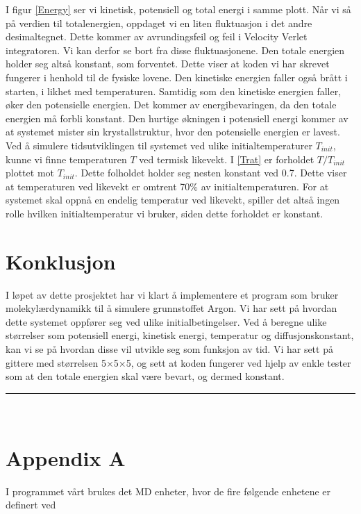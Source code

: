 \documentclass[paper=a4, fontsize=11pt]{scrartcl} %
\numberwithin{equation}{section} %
\numberwithin{figure}{section} %
\numberwithin{table}{section} %
\newcommand{\horrule}[1]{\rule{\linewidth}{#1}} %
\begin{document}
I figur \ref{Energy} ser vi kinetisk, potensiell og total energi i samme plott. Når vi så på verdien til totalenergien, oppdaget vi en liten fluktuasjon i det andre desimaltegnet. Dette kommer av avrundingsfeil og feil i Velocity Verlet integratoren. Vi kan derfor se bort fra disse fluktuasjonene. Den totale energien holder seg altså konstant, som forventet. Dette viser at koden vi har skrevet fungerer i henhold til de fysiske lovene. Den kinetiske energien faller også brått i starten, i likhet med temperaturen. Samtidig som den kinetiske energien faller, øker den potensielle energien. Det kommer av energibevaringen, da den totale energien må forbli konstant. Den hurtige økningen i potensiell energi kommer av at systemet mister sin krystallstruktur, hvor den potensielle energien er lavest. \\

Ved å simulere tidsutviklingen til systemet ved ulike initialtemperaturer $T_{init}$, kunne vi finne temperaturen $T$ ved termisk likevekt. I \ref{Trat} er forholdet $T/T_{init}$ plottet mot $T_{init}$. Dette folholdet holder seg nesten konstant ved 0.7. Dette viser at temperaturen ved likevekt er omtrent 70$\%$ av initialtemperaturen. For at systemet skal oppnå en endelig temperatur ved likevekt, spiller det altså ingen rolle hvilken initialtemperatur vi bruker, siden dette forholdet er konstant.\\




\section{Konklusjon}
I løpet av dette prosjektet har vi klart å implementere et program som bruker molekylærdynamikk til å simulere grunnstoffet Argon. Vi har sett på hvordan dette systemet oppfører seg ved ulike initialbetingelser. Ved å beregne ulike størrelser som potensiell energi, kinetisk energi, temperatur og diffusjonskonstant, kan vi se på hvordan disse vil utvikle seg som funksjon av tid. Vi har sett på gittere med størrelsen 5$\times$5$\times$5, og sett at koden fungerer ved hjelp av enkle tester som at den totale energien skal være bevart, og dermed konstant. 


\horrule{2pt} \\[0.5cm] %

\section{Appendix A}
I programmet vårt brukes det MD enheter, hvor de fire følgende enhetene er definert ved
\end{document}
